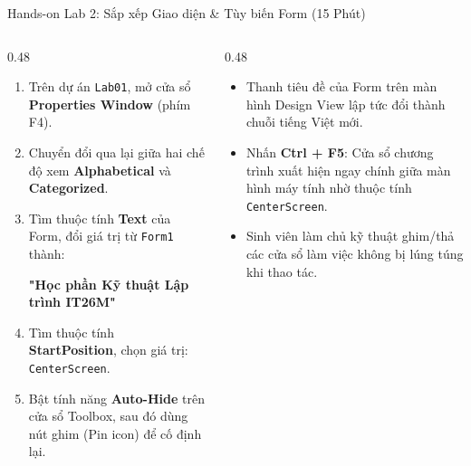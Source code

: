\documentclass[aspectratio=169, 10pt]{beamer}
\begin{document}
\begin{frame}{Hands-on Lab 2: Sắp xếp Giao diện \& Tùy biến Form (15 Phút)}
  \begin{columns}[T]
    \begin{column}{0.48\textwidth}
      \begin{tcolorbox}[colback=CSharpPurple!5,colframe=CSharpPurple,title=\textbf{NHIỆM VỤ THỰC HÀNH TẠI CHỖ:},fonttitle=\small\bfseries]
        \begin{enumerate}\small
          \item Trên dự án \texttt{Lab01}, mở cửa sổ \textbf{Properties Window} (phím F4).
          \item Chuyển đổi qua lại giữa hai chế độ xem \textbf{Alphabetical} và \textbf{Categorized}.
          \item Tìm thuộc tính \textbf{Text} của Form, đổi giá trị từ \texttt{Form1} thành:
            \begin{center}\textbf{"Học phần Kỹ thuật Lập trình IT26M"}\end{center}
          \item Tìm thuộc tính \textbf{StartPosition}, chọn giá trị: \texttt{CenterScreen}.
          \item Bật tính năng \textbf{Auto-Hide} trên cửa sổ Toolbox, sau đó dùng nút ghim (Pin icon) để cố định lại.
        \end{enumerate}
      \end{tcolorbox}
    \end{column}

    \begin{column}{0.48\textwidth}
      \begin{tcolorbox}[colback=UniNavy!5,colframe=UniNavy,title=\textbf{KẾT QUẢ KIỂM CHỨNG:},fonttitle=\small\bfseries]
        \begin{itemize}\small
          \item Thanh tiêu đề của Form trên màn hình Design View lập tức đổi thành chuỗi tiếng Việt mới.
          \item Nhấn \textbf{Ctrl + F5}: Cửa sổ chương trình xuất hiện ngay chính giữa màn hình máy tính nhờ thuộc tính \texttt{CenterScreen}.
          \item Sinh viên làm chủ kỹ thuật ghim/thả các cửa sổ làm việc không bị lúng túng khi thao tác.
        \end{itemize}
      \end{tcolorbox}
    \end{column}
  \end{columns}
\end{frame}
\end{document}

